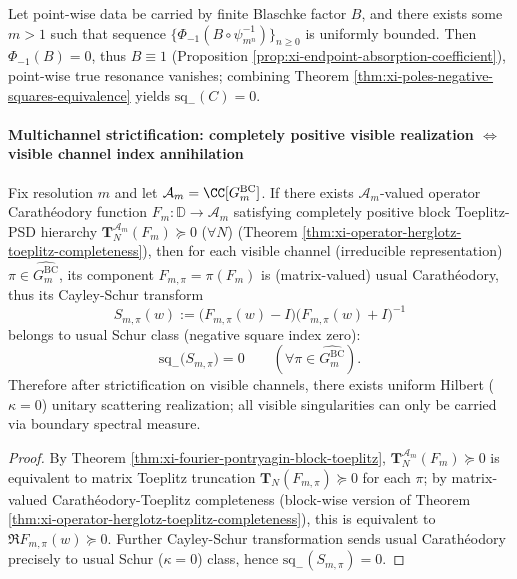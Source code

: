 \begin{corollary}[Rigid sufficient condition of cross-scale closure: bounded endpoint flux \(\Rightarrow\) \texorpdfstring{$\kappa=0$}{kappa=0}]\label{cor:xi-bounded-flux-forces-kappa0}
Let point-wise data be carried by finite Blaschke factor \(B\), and there exists some \(m>1\) such that sequence
\(\{\Phi_{-1}(B\circ\psi_{m^n}^{-1})\}_{n\ge 0}\)
is uniformly bounded.
Then \(\Phi_{-1}(B)=0\), thus \(B\equiv 1\) (Proposition \ref{prop:xi-endpoint-absorption-coefficient}), point-wise true resonance vanishes;
combining Theorem \ref{thm:xi-poles-negative-squares-equivalence} yields \(\mathrm{sq}_-(C)=0\).
\end{corollary}

\paragraph{Multichannel strictification: completely positive visible realization \texorpdfstring{$\Longleftrightarrow$}{<->} visible channel index annihilation}
\begin{theorem}[Completely positive visible realization \texorpdfstring{$\Rightarrow$}{=>} visible channel negative square index zero]\label{thm:xi-cp-visible-implies-kappa0}
Fix resolution \(m\) and let \(\mathcal{A}_m=\CC[G^{\mathrm{BC}}_m]\).
If there exists \(\mathcal{A}_m\)-valued operator Carathéodory function \(F_m:\mathbb{D}\to\mathcal{A}_m\) satisfying completely positive block Toeplitz-PSD hierarchy
\(\mathbf{T}^{\mathcal{A}_m}_N(F_m)\succeq 0\) (\(\forall N\)) (Theorem \ref{thm:xi-operator-herglotz-toeplitz-completeness}),
then for each visible channel (irreducible representation) \(\pi\in\widehat{G^{\mathrm{BC}}_m}\), its component \(F_{m,\pi}=\pi(F_m)\) is (matrix-valued) usual Carathéodory, thus its Cayley-Schur transform
\[
S_{m,\pi}(w):=\bigl(F_{m,\pi}(w)-I\bigr)\bigl(F_{m,\pi}(w)+I\bigr)^{-1}
\]
belongs to usual Schur class (negative square index zero):
\[
\boxed{\;\mathrm{sq}_-\!\bigl(S_{m,\pi}\bigr)=0\qquad(\forall \pi\in\widehat{G^{\mathrm{BC}}_m}).\;}
\]
Therefore after strictification on visible channels, there exists uniform Hilbert (\(\kappa=0\)) unitary scattering realization; all visible singularities can only be carried via boundary spectral measure.
\end{theorem}

\begin{proof}
By Theorem \ref{thm:xi-fourier-pontryagin-block-toeplitz}, \(\mathbf{T}^{\mathcal{A}_m}_N(F_m)\succeq 0\) is equivalent to matrix Toeplitz truncation \(\mathbf{T}_N(F_{m,\pi})\succeq 0\) for each \(\pi\);
by matrix-valued Carathéodory-Toeplitz completeness (block-wise version of Theorem \ref{thm:xi-operator-herglotz-toeplitz-completeness}), this is equivalent to \(\Re F_{m,\pi}(w)\succeq 0\).
Further Cayley-Schur transformation sends usual Carathéodory precisely to usual Schur (\(\kappa=0\)) class, hence \(\mathrm{sq}_-(S_{m,\pi})=0\).
\end{proof}

